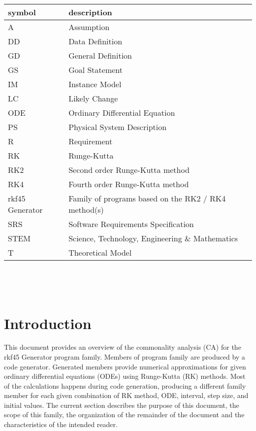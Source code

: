 \documentclass[12pt]{article}
\newcommand{\famname}{rkf45 Generator} %
\begin{document}
\renewcommand{\arraystretch}{1.2}
\begin{tabular}{l l} 
  \toprule
  \textbf{symbol} & \textbf{description}\\
  \midrule 
  A & Assumption\\
  DD & Data Definition\\
  GD & General Definition\\
  GS & Goal Statement\\
  IM & Instance Model\\
  LC & Likely Change\\
  ODE & Ordinary Differential Equation\\
  PS & Physical System Description\\
  R & Requirement\\
  RK & Runge-Kutta\\
  RK2 & Second order Runge-Kutta method\\
  RK4 & Fourth order Runge-Kutta method\\
  \famname{} & Family of programs based on the RK2 / RK4 method(s)\\
  SRS & Software Requirements Specification\\
  STEM & Science, Technology, Engineering \& Mathematics\\
  T & Theoretical Model\\
  \bottomrule
\end{tabular}\\

\newpage

\tableofcontents

~\newpage


\section{Introduction}
This document provides an overview of the commonality analysis (CA) for the 
\famname{} program family. Members of program family are produced by a code 
generator. Generated members provide numerical approximations for given 
ordinary differential equations (ODEs) using Runge-Kutta (RK) methods. Most of 
the calculations happens during code generation, producing a different family 
member for each given combination of RK method, ODE, interval, step size, and 
initial values. 
The current section describes the purpose of this document, the scope of this 
family, the organization of the remainder of the document and the 
characteristics of the intended reader.
\end{document}
